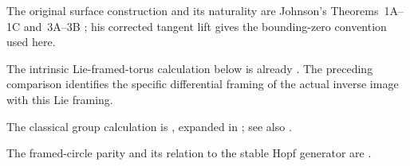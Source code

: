 The original surface construction and its naturality are Johnson’s Theorems~1A--1C and~3A--3B \cite[pp.~366--371]{Johnson1980Root}; his corrected tangent lift gives the bounding-zero convention used here.

The intrinsic Lie-framed-torus calculation below is already \cite[Example~3.8]{DebrayGunningham2018Root}. The preceding comparison identifies the specific differential framing of the actual inverse image with this Lie framing.

The classical group calculation is \cite[pp.~957--959]{Pontryagin1950Root}, expanded in \cite[\S15, Theorem~24, pp.~109--112 of the English translation]{Pontryagin1955Root}; see also \cite[pp.~384--385]{Hatcher2002}.

The framed-circle parity and its relation to the stable Hopf generator are \cite[\S14, Theorems~20--21, pp.~96--101 of the English translation]{Pontryagin1955Root}.
